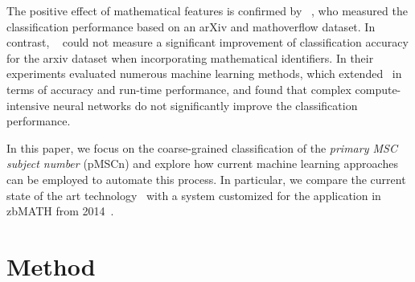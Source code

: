The positive effect of mathematical features is confirmed by \citeauthor{SuzukiF17}~\cite{SuzukiF17}, who measured the classification performance based on an arXiv and mathoverflow dataset.
In contrast, \citeauthor{Scharpf2020}~\cite{Scharpf2020} could not measure a significant improvement of classification accuracy for the arxiv dataset when incorporating mathematical identifiers.
In their experiments \citeauthor{Scharpf2020} evaluated numerous machine learning methods, which extended~\cite{Evans17,SojkaNALS19} in terms of accuracy and run-time performance, and found that complex compute-intensive neural networks do not significantly improve the classification performance.

In this paper, we focus on the coarse-grained classification of the \emph{primary MSC subject number} (pMSCn) and explore how current machine learning approaches can be employed to automate this process.
In particular, we compare the current state of the art technology~\cite{Scharpf2020} with a system customized for the application in zbMATH from 2014~\cite{SchonebergS14}.
\\

\noindent\hspace{-.01\textwidth}

\section{Method}\label{sec:method}


